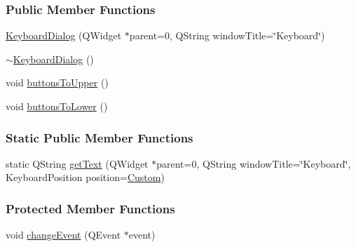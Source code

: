 \subsubsection*{Public Member Functions}
\begin{DoxyCompactItemize}
\item 
\mbox{\hyperlink{classKeyboardDialog_afb05238e8046e60d2c25e022c810f665}{Keyboard\+Dialog}} (Q\+Widget $\ast$parent=0, Q\+String window\+Title=\char`\"{}Keyboard\char`\"{})
\item 
\mbox{\hyperlink{classKeyboardDialog_aa430c1c9aaa94d79e8d83aec7753c21a}{$\sim$\+Keyboard\+Dialog}} ()
\item 
void \mbox{\hyperlink{classKeyboardDialog_a7a276672e902fa810e3c06047992fd69}{buttons\+To\+Upper}} ()
\item 
void \mbox{\hyperlink{classKeyboardDialog_af8f1934505c0f78ad6b2a1e6aeb4cb2e}{buttons\+To\+Lower}} ()
\end{DoxyCompactItemize}
\subsubsection*{Static Public Member Functions}
\begin{DoxyCompactItemize}
\item 
static Q\+String \mbox{\hyperlink{classKeyboardDialog_ab76b5389fc4f4628b2fa6897da0efa28}{get\+Text}} (Q\+Widget $\ast$parent=0, Q\+String window\+Title=\char`\"{}Keyboard\char`\"{}, Keyboard\+Position position=\mbox{\hyperlink{classKeyboardDialog_a7151e64aa0ea07c96bcb582722f39b70ae3f3821683c5ddc59b87508d3f67d6eb}{Custom}})
\end{DoxyCompactItemize}
\subsubsection*{Protected Member Functions}
\begin{DoxyCompactItemize}
\item 
void \mbox{\hyperlink{classKeyboardDialog_a0c118ece8b936e3393bb3124415dde6b}{change\+Event}} (Q\+Event $\ast$event)
\end{DoxyCompactItemize}
